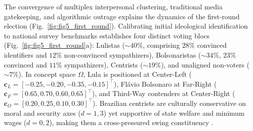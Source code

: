 \documentclass[11pt,a4paper]{article}
\begin{document}
The convergence of multiplex interpersonal clustering, traditional media gatekeeping, and algorithmic outrage explains the dynamics of the first-round election (Fig.~\ref{fig:fig5_first_round}). Calibrating initial ideological identification to national survey benchmarks \citep{datafolha2024identificacao} establishes four distinct voting blocs (Fig.~\ref{fig:fig5_first_round}a): Lulistas ($\sim 40\%$, comprising $28\%$ convinced identifiers and $12\%$ non-convinced sympathizers), Bolsonaristas ($\sim 34\%$, $23\%$ convinced and $11\%$ sympathizers), Centrists ($\sim 19\%$), and unaligned non-voters ($\sim 7\%$). In concept space $\Omega$, Lula is positioned at Center-Left ($\mathbf{c}_L = [-0.25, -0.20, -0.35, -0.15]^\top$), Flávio Bolsonaro at Far-Right ($\mathbf{c}_F = [0.65, 0.70, 0.60, 0.65]^\top$), and Third-Way contenders at Center-Right ($\mathbf{c}_O = [0.20, 0.25, 0.10, 0.30]^\top$). Brazilian centrists are culturally conservative on moral and security axes ($d=1, 3$) yet supportive of state welfare and minimum wages ($d=0, 2$), making them a cross-pressured swing constituency \citep{almeida2019evangelicals}.
\end{document}
